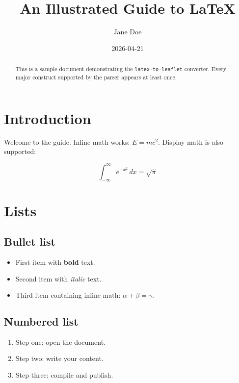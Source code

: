 \documentclass{article}
\title{An Illustrated Guide to \LaTeX}
\author{Jane Doe}
\date{2026-04-21}
\begin{document}
\maketitle

\begin{abstract}
This is a sample document demonstrating the \texttt{latex-to-leaflet} converter.
Every major construct supported by the parser appears at least once.
\end{abstract}

\section{Introduction}

Welcome to the guide. Inline math works: $E = mc^2$.
Display math is also supported:

\begin{equation}
    \int_{-\infty}^{\infty} e^{-x^2} \, dx = \sqrt{\pi}
    \label{eq:gaussian}
\end{equation}

\section{Lists}

\subsection{Bullet list}

\begin{itemize}
    \item First item with \textbf{bold} text.
    \item Second item with \textit{italic} text.
    \item Third item containing inline math: $\alpha + \beta = \gamma$.
\end{itemize}

\subsection{Numbered list}

\begin{enumerate}
    \item Step one: open the document.
    \item Step two: write your content.
    \item Step three: compile and publish.
\end{enumerate}
\end{document}
